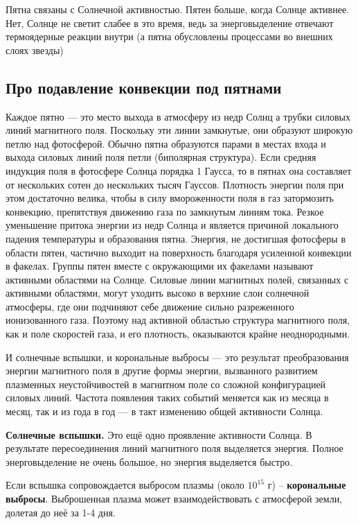 Пятна связаны с Солнечной активностью. Пятен больше, когда Солнце активнее. Нет, Солнце не светит слабее в это время, ведь за энерговыделение отвечают термоядерные реакции внутри (а пятна обусловлены процессами во внешних слоях звезды)

\subsection{Про подавление конвекции под пятнами}

Каждое пятно — это место выхода в атмосферу из недр Солнц а трубки силовых линий магнитного поля. Поскольку эти линии замкнутые, они образуют широкую петлю над фотосферой. Обычно пятна образуются парами в местах входа и выхода силовых линий поля петли (биполярная структура). Если средняя индукция поля в фотосфере Солнца порядка 1 Гаусса, то в пятнах она составляет от нескольких сотен до нескольких тысяч Гауссов. Плотность энергии поля при этом достаточно велика, чтобы в силу вмороженности поля в газ затормозить конвекцию, препятствуя движению газа по замкнутым линиям тока. Резкое уменьшение притока энергии из недр Солнца и является причиной локального падения температуры и образования пятна. Энергия, не достигшая фотосферы в области пятен, частично выходит на поверхность благодаря усиленной конвекции в факелах. Группы пятен вместе с окружающими их факелами называют активными областями на Солнце. Силовые линии магнитных полей, связанных с активными областями, могут уходить высоко в верхние слои солнечной атмосферы, где они подчиняют себе движение сильно разреженного ионизованного газа. Поэтому над активной областью структура магнитного поля, как и поле скоростей газа, и его плотность, оказываются крайне неоднородными.

И солнечные вспышки, и корональные выбросы — это результат преобразования энергии магнитного поля в другие формы энергии, вызванного развитием плазменных неустойчивостей в магнитном поле со сложной конфигурацией силовых линий. Частота появления таких событий меняется как из месяца в месяц, так и из года в год — в такт изменению общей активности Солнца. 

\textbf{Солнечные вспышки.} Это ещё одно проявление активности Солнца. В результате пересоединения линий магнитного поля выделяется энергия. Полное энерговыделение не очень большое, но энергия выделяется быстро.

Если вспышка сопровождается выбросом плазмы (около $10^{15}$ г) – \textbf{корональные выбросы}. Выброшенная плазма может взаимодействовать с атмосферой земли, долетая до неё за 1-4 дня.

